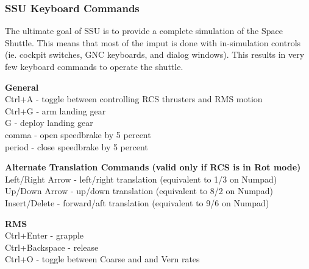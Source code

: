 \documentclass[13pt]{article}
\begin{document}
\subsubsection{SSU Keyboard Commands}
The ultimate goal of SSU is to provide a complete simulation of the Space Shuttle.  This means that most of the imput is done with in-simulation controls (ie. cockpit switches, GNC keyboards, and dialog windows). This results in very few keyboard commands to operate the shuttle.

\begin{center}
  \textbf{General}\\
  Ctrl+A - toggle between controlling RCS thrusters and RMS motion\\
  Ctrl+G - arm landing gear\\
  G - deploy landing gear\\
  comma - open speedbrake by 5 percent\\
  period - close speedbrake by 5 percent\\
  \vspace{\baselineskip}

  \textbf{Alternate Translation Commands (valid only if RCS is in Rot mode)}\\
  Left/Right Arrow - left/right translation (equivalent to 1/3 on Numpad)\\
  Up/Down Arrow - up/down translation (equivalent to 8/2 on Numpad)\\
  Insert/Delete - forward/aft translation (equivalent to 9/6 on Numpad)\\
  \vspace{\baselineskip}

  \textbf{RMS}\\
  Ctrl+Enter - grapple\\
  Ctrl+Backspace - release\\
  Ctrl+O - toggle between Coarse and and Vern rates\\
\end{center}
\end{document}
